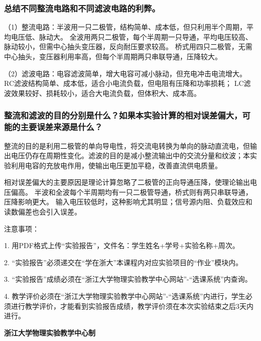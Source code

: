 \documentclass[10pt,a4paper]{ctexart} %
\begin{document}
    \subsubsection{总结不同整流电路和不同滤波电路的利弊。}

    （1）整流电路：半波用一只二极管，结构简单、成本低，但只利用半个周期，平均电压低、脉动大。
    全波用两只二极管，每个半周期一只导通，平均电压较高、脉动较小，但需中心抽头变压器，反向耐压要求较高。
    桥式用四只二极管，无需中心抽头，变压器利用率高，但每个半周期两只串联导通，压降较大。

    \begin{samepage}
    （2）滤波电路：电容滤波简单，增大电容可减小脉动，但充电冲击电流增大。
    RC滤波结构简单、成本低，适合小电流负载，但电阻有压降和功率损耗；
    LC滤波效果较好、损耗较小，适合大电流负载，但体积大、成本高。\par
    \end{samepage}

    \subsubsection{整流和滤波的目的分别是什么？如果本实验计算的相对误差偏大，可能的主要误差来源是什么？}

    整流的目的是利用二极管的单向导电性，将交流电转换为单向的脉动直流电，但输出电压仍存在周期性变化。滤波的目的是减小整流输出中的交流分量和纹波；本实验利用电容的充放电作用，使输出电压更加平稳，改善直流供电质量。
    
    相对误差偏大的主要原因是理论计算忽略了二极管的正向导通压降，使理论输出电压偏高。
    半波和全波每个半周期均有一只二极管导通，桥式则有两只串联导通，压降影响更大。
    输入电压较低时，这种影响尤其明显；信号源内阻、负载效应和读数偏差也会引入误差。

\vspace*{\fill} %
\noindent
\begin{minipage}{\textwidth}
  注意事项：

  \begingroup
    \setlength{\leftskip}{2em} %
    1. 用PDF格式上传“实验报告”，文件名：学生姓名+学号+实验名称+周次。

    2. “实验报告”必须递交在“学在浙大”本课程内对应实验项目的“作业”模块内。

    3. “实验报告”成绩必须在“浙江大学物理实验教学中心网站”-“选课系统”内查询。

    4. 教学评价必须在“浙江大学物理实验教学中心网站”-“选课系统”内进行，学生必须进行教学评价，才能看到实验报告成绩，教学评价须在本次实验结束之后3天内进行。\par
  \endgroup

  \begin{center}
    {\bfseries 浙江大学物理实验教学中心制}
  \end{center}
\end{minipage}
\end{document}

